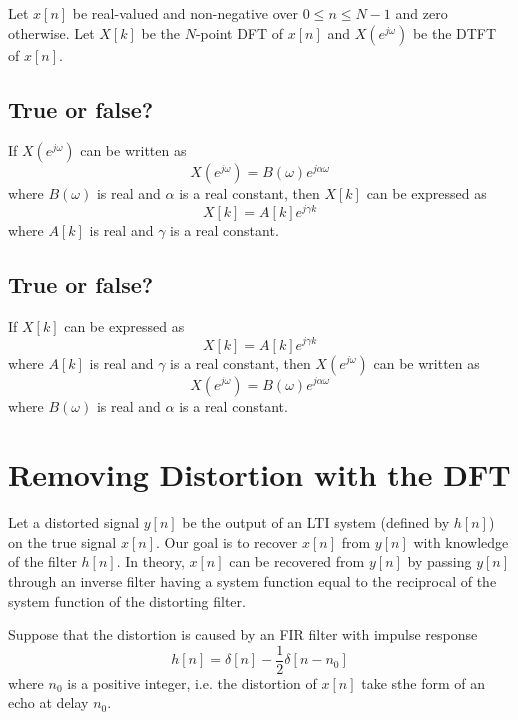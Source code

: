 \documentclass[11pt]{article}
\begin{document}
Let $x[n]$ be real-valued and non-negative over $0\leq n \leq N-1$ and zero otherwise. Let $X[k]$ be the $N$-point DFT of $x[n]$ and $X(e^{j\omega})$ be the DTFT of $x[n]$.

\subsection*{True or false?}
If $X(e^{j\omega})$ can be written as 
\[X(e^{j\omega})=B(\omega)e^{j \alpha \omega}\]
where $B(\omega)$ is real and $\alpha$ is a real constant, then $X[k]$ can be expressed as \[X[k]=A[k]e^{j \gamma k}\]
where $A[k]$ is real and $\gamma$ is a real constant.

\subsection*{True or false?}
If $X[k]$ can be expressed as 
\[X[k]=A[k]e^{j \gamma k}\]
where $A[k]$ is real and $\gamma$ is a real constant, then $X(e^{j\omega})$ can be written as \[X(e^{j\omega})=B(\omega)e^{j \alpha \omega}\]
where $B(\omega)$ is real and $\alpha$ is a real constant.

\section{Removing Distortion with the DFT}

Let a distorted signal $y[n]$ be the output of an LTI system (defined by $h[n]$) on the true signal $x[n]$. Our goal is to recover $x[n]$ from $y[n]$ with knowledge of the filter $h[n]$. In theory, $x[n]$ can be recovered from $y[n]$ by passing $y[n]$ through an inverse filter having a system function equal to the reciprocal of the system function of the distorting filter.

Suppose that the distortion is caused by an FIR filter with impulse response 
\[ h[n] = \delta[n] -\frac{1}{2}\delta[n-n_0] \]
where $n_0$ is a positive integer, i.e. the distortion of $x[n]$ take sthe form of an echo at delay $n_0$.
\end{document}
